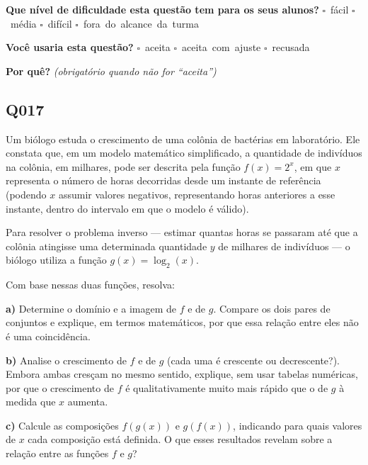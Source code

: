 \documentclass[11pt,a4paper]{article}
\begin{document}
\textbf{Que nível de dificuldade esta questão tem para os seus alunos?}\quad
\mbox{$\square$~fácil} \quad \mbox{$\square$~média} \quad
\mbox{$\square$~difícil} \quad \mbox{$\square$~fora do alcance da turma}

\textbf{Você usaria esta questão?}\quad
\mbox{$\square$~aceita} \quad \mbox{$\square$~aceita com ajuste} \quad
\mbox{$\square$~recusada}

\textbf{Por quê?} \emph{(obrigatório quando não for ``aceita'')}

\underline{\hspace{\linewidth}}

\underline{\hspace{\linewidth}}
\vspace{0.6em}

\begin{samepage}
\subsection*{Q017}
Um biólogo estuda o crescimento de uma colônia de bactérias em laboratório. Ele constata que, em um modelo matemático simplificado, a quantidade de indivíduos na colônia, em milhares, pode ser descrita pela função $f(x) = 2^{x}$, em que $x$ representa o número de horas decorridas desde um instante de referência (podendo $x$ assumir valores negativos, representando horas anteriores a esse instante, dentro do intervalo em que o modelo é válido).

Para resolver o problema inverso — estimar quantas horas se passaram até que a colônia atingisse uma determinada quantidade $y$ de milhares de indivíduos — o biólogo utiliza a função $g(x) = \log_{2}(x)$.

Com base nessas duas funções, resolva:

\textbf{a)} Determine o domínio e a imagem de $f$ e de $g$. Compare os dois pares de conjuntos e explique, em termos matemáticos, por que essa relação entre eles não é uma coincidência.

\textbf{b)} Analise o crescimento de $f$ e de $g$ (cada uma é crescente ou decrescente?). Embora ambas cresçam no mesmo sentido, explique, sem usar tabelas numéricas, por que o crescimento de $f$ é qualitativamente muito mais rápido que o de $g$ à medida que $x$ aumenta.

\textbf{c)} Calcule as composições $f(g(x))$ e $g(f(x))$, indicando para quais valores de $x$ cada composição está definida. O que esses resultados revelam sobre a relação entre as funções $f$ e $g$?


\end{samepage}
\end{document}
